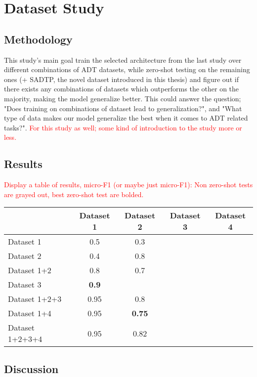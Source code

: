 \chapter{Dataset Study}

\section{Methodology}

This study's main goal train the selected architecture from the last study over different combinations of \gls{ADT} datasets, while zero-shot testing on the remaining ones (+ SADTP, the novel dataset introduced in this thesis) and figure out if there exists any combinations of datasets which outperforms the other on the majority, making the model generalize better. This could answer the question; "Does training on combinations of dataset lead to generalization?", and "What type of data makes our model generalize the best when it comes to \gls{ADT} related tasks?". \textcolor{red}{For this study as well; some kind of introduction to the study more or less.}

\section{Results}

\textcolor{red}{Display a table of results, micro-F1 (or maybe just micro-F1):
Non zero-shot tests are grayed out, best zero-shot test are bolded.}

\begin{center}
    \begin{tabular}{|l|cccc|}
    \hline
                     & Dataset 1 & Dataset 2 & Dataset 3 & Dataset 4 \\
    \hline
    Dataset 1        & 0.5       & 0.3          &           &           \\
    Dataset 2        & \cellcolor{blue!10}0.4       & 0.8          &           &           \\
    Dataset 1+2      & 0.8       & 0.7          &           &           \\
    Dataset 3        & \cellcolor{blue!10}\textbf{0.9}       & \cellcolor{blue!10}{0.6}          &           &           \\
    Dataset 1+2+3    & 0.95      & 0.8          &           &           \\   
    Dataset 1+4      & 0.95      & \cellcolor{blue!10}\textbf{0.75}          &           &           \\   
    Dataset 1+2+3+4  & 0.95      & 0.82          &           &           \\   
    \hline

    \end{tabular}
\end{center}

\section{Discussion}